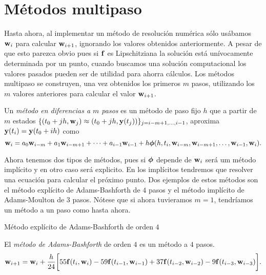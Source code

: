 \section{Métodos multipaso}

Hasta ahora, al implementar un método de resolución numérica sólo usábamos
$\vb{w}{}_i$ para calcular $\vb{w}{}_{i+1}$,
ignorando los valores obtenidos anteriormente.
A pesar de que esto parezca obvio pues si $\vb{f}{}$ es Lipschitziana
la solución está unívocamente determinada por un punto,
cuando buscamos una solución computacional
los valores pasados pueden ser de utilidad para ahorra cálculos.
Los métodos multipaso se construyen, una vez obtenidos los primeros $m$ pasos,
utilizando los $m$ valores anteriores para calcular el valor $\vb{w}{}_{i+1}$.

\begin{definition}
    Un \emph{método en diferencias a $m$ pasos} es un método de paso fijo $h$
    que a partir de $m$ estados
    $\{(t_0 + jh, \vb{w}{}_j) \approx (t_0 + jh, \vb{y}{}(t_j))\}_{j = i-m+1,\ldots,i-1}$,
    aproxima $\vb{y}{}(t_i) = \vb{y}{}(t_0 + ih)$ como
    \begin{equation*}
        \vb{w}{}_i = a_0\vb{w}{}_{i-m} + a_1\vb{w}{}_{i-m+1} + \dots + a_{i-1}\vb{w}{}_{i-1}
            + h\vb*{\phi}{}(h, t_i, \vb{w}{}_{i-m}, \vb{w}{}_{i-m+1}, \dots, \vb{w}{}_{i-1}, \vb{w}{}_i).
    \end{equation*}
\end{definition}

Ahora tenemos dos tipos de métodos, pues si $\vb*{\phi}{}$ depende de $\vb{w}{}_i$
será um método implícito y en otro caso será explicito.
En los implícitos tendremos que resolver una ecuación
para calcular el próximo punto.
Dos ejemplos de estos métodos son
el método explícito de Adams-Bashforth de $4$ pasos y
el método implícito de Adams-Moulton de $3$ pasos.
Nótese que si ahora tuvieramos $m = 1$,
tendríamos un método a un paso como hasta ahora.

\begin{method}{Método explícito de Adams-Bashforth de orden $4$}
    \label{met:AB4steps}

    El \emph{método de Adams-Bashforth} de orden $4$
    es un método a $4$ pasos.
    \begin{equation}
        \vb{w}{}_{i+1} = \vb{w}{}_i + \frac{h}{24}\qty\bigg[
            55\vb{f}{}(t_i, \vb{w}{}_i) - 59\vb{f}{}(t_{i-1}, \vb{w}{}_{i-1})
            + 37\vb{f}{}(t_{i-2}, \vb{w}{}_{i-2}) - 9\vb{f}{}(t_{i-3}, \vb{w}{}_{i-3})
        ].
    \end{equation}
\end{method}

